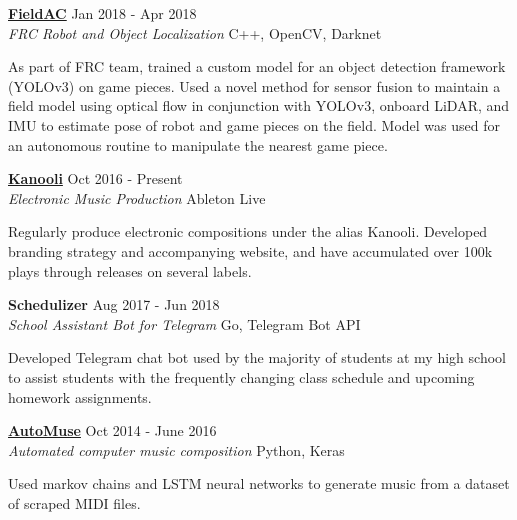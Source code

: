 \documentclass[11pt]{extarticle}
\begin{document}
\noindent
\href{https://github.com/RoboticsTeam4904/FieldAC}{\textbf{FieldAC}} \hfill Jan 2018 - Apr 2018\\
\textit{FRC Robot and Object Localization} \hfill C++, OpenCV, Darknet\\
\vspace{-25pt}
\begin{paragraph}{}
As part of FRC team, trained a custom model for an object detection framework (YOLOv3) on game pieces. Used a novel method for sensor fusion to maintain a field model using optical flow in conjunction with YOLOv3, onboard LiDAR, and IMU to estimate pose of robot and game pieces on the field. Model was used for an autonomous routine to manipulate the nearest game piece.\\
\end{paragraph}

\noindent
\href{https://kanooli.com/}{\textbf{Kanooli}} \hfill Oct 2016 - Present\\
\textit{Electronic Music Production} \hfill Ableton Live\\
\vspace{-25pt}
\begin{paragraph}{}
	Regularly produce electronic compositions under the alias Kanooli. Developed branding strategy and accompanying website, and have accumulated over 100k plays through releases on several labels.\\
\end{paragraph}

\noindent
\textbf{Schedulizer} \hfill Aug 2017 - Jun 2018\\
\textit{School Assistant Bot for Telegram} \hfill Go, Telegram Bot API \\ 
\vspace{-25pt}
\begin{paragraph}{}
Developed Telegram chat bot used by the majority of students at my high school to assist students with the frequently changing class schedule and upcoming homework assignments. \\
\end{paragraph}

\noindent
\href{https://github.com/nacgarg/AutoMuse}{\textbf{AutoMuse}} \hfill Oct 2014 - June 2016\\
\textit{Automated computer music composition} \hfill Python, Keras \\
\vspace{-25pt}
\begin{paragraph}{}
Used markov chains and LSTM neural networks to generate music from a dataset of scraped MIDI files. \\ 

\end{paragraph}
\end{document}
